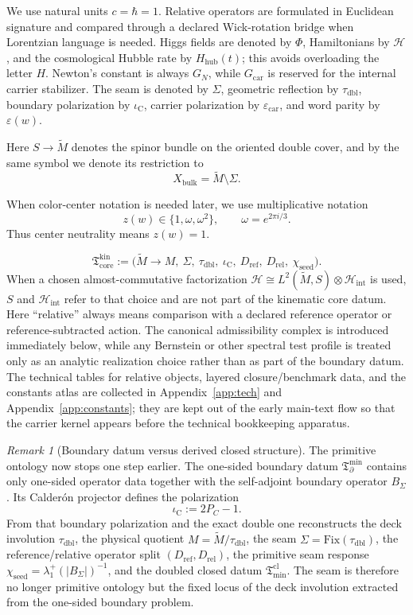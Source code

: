 \documentclass[11pt,a4paper]{article}
\theoremstyle{definition}
\theoremstyle{remark}
\newtheorem*{remark}{Remark}
\newcommand{\Seam}{\Sigma}
\newcommand{\taudbl}{\tau_{\mathrm{dbl}}}
\newcommand{\iC}{\iota_{\mathrm C}}
\newcommand{\epscar}{\varepsilon_{\mathrm{car}}}
\newcommand{\Xbulk}{X_{\mathrm{bulk}}}
\newcommand{\Hhub}{H_{\mathrm{hub}}}
\newcommand{\Hint}{\mathcal H_{\mathrm{int}}}
\newcommand{\Tmin}{\mathfrak T_{\mathrm{min}}}
\newcommand{\Tbound}{\mathfrak T_{\partial}^{\min}}
\newcommand{\chiseed}{\chi_{\mathrm{seed}}}
\newcommand{\Tcore}{\mathfrak T_{\mathrm{core}}}
\begin{document}
We use natural units $c=\hbar=1$. Relative operators are formulated in Euclidean signature and compared through a declared Wick-rotation bridge when Lorentzian language is needed. Higgs fields are denoted by $\Phi$, Hamiltonians by $\mathcal H$, and the cosmological Hubble rate by $\Hhub(t)$; this avoids overloading the letter $H$. Newton's constant is always $G_N$, while $G_{\mathrm{car}}$ is reserved for the internal carrier stabilizer. The seam is denoted by $\Seam$, geometric reflection by $\taudbl$, boundary polarization by $\iC$, carrier polarization by $\epscar$, and word parity by $\varepsilon(w)$.

Here $S\to \widetilde M$ denotes the spinor bundle on the oriented double cover, and by the same symbol we denote its restriction to
\[
\Xbulk=\widetilde M\setminus\Seam.
\]

When color-center notation is needed later, we use multiplicative notation
\[
z(w)\in\{1,\omega,\omega^2\},
\qquad
\omega=e^{2\pi i/3}.
\]
Thus center neutrality means $z(w)=1$.

\[
\Tcore^{\mathrm{kin}}
:=
\bigl(
\widetilde M\to M,\ \Seam,\ \taudbl,\ \iC,\ D_{\mathrm{ref}},\ D_{\mathrm{rel}},\ \chiseed
\bigr).
\]
When a chosen almost-commutative factorization
$\mathcal H\cong L^2(\widetilde M,S)\otimes\Hint$ is used, $S$ and $\Hint$ refer to that
choice and are not part of the kinematic core datum.
Here \enquote{relative} always means comparison with a declared reference operator or
reference-subtracted action. The canonical admissibility complex is introduced immediately below,
while any Bernstein or other spectral test profile is treated only as an analytic realization
choice rather than as part of the boundary datum. The technical tables for relative objects,
layered closure/benchmark data, and the constants atlas are collected in
Appendix~\ref{app:tech} and Appendix~\ref{app:constants}; they are kept out of the early
main-text flow so that the carrier kernel appears before the technical bookkeeping apparatus.

\begin{remark}[Boundary datum versus derived closed structure]
The primitive ontology now stops one step earlier. The one-sided boundary datum $\Tbound$
contains only one-sided operator data together with the self-adjoint boundary operator
$B_\Sigma$. Its Calder\'on projector defines the polarization
\[
\iC:=2P_C-1.
\]
From that boundary polarization and the exact double one reconstructs the deck involution
$\taudbl$, the physical quotient $M=\widetilde M/\taudbl$, the seam
$\Seam=\mathrm{Fix}(\taudbl)$, the reference/relative operator split
$(D_{\mathrm{ref}},D_{\mathrm{rel}})$, the primitive seam response
$\chiseed=\lambda_1^+(|B_\Sigma|)^{-1}$, and the doubled closed datum
$\Tmin^{\mathrm{cl}}$. The seam is therefore no longer primitive ontology but the fixed locus of
the deck involution extracted from the one-sided boundary problem.
\end{remark}
\end{document}
